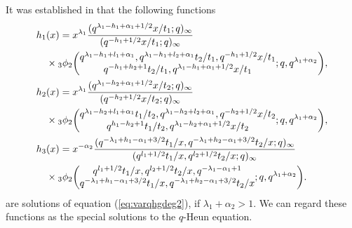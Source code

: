 \documentclass[12pt]{amsart}
\numberwithin{equation}{section}
\theoremstyle{definition}
\theoremstyle{remark}
\begin{document}
It was established in \cite[Theorem 4.5]{AT} that the following functions
 \begin{align}
& h_1 (x) = x^{ \lambda _{1} } \frac{( q^{ \lambda _{1} - h_{1} + \alpha _{1} + 1/2}x/t_{1}; q)_\infty}{( q^{-h_{1} + 1/2}x/t_{1}; q)_\infty} \label{eq:solvarHG2} \\
  &\quad \times {}_3\phi_2 \biggl( \begin{array}{@{}c@{}} q^{ \lambda _{1} -h_{1} + l_{1} + \alpha _{1} }, q^{ \lambda _{1} -h_{1} + l_{2} + \alpha _{1} }t_{2}/t_{1}, q^{-h_{1} + 1/2}x/t_{1} \\
     q^{- h_{1} + h_{2} + 1}t_{2}/t_{1}, q^{ \lambda _{1} - h_{1} + \alpha _{1} + 1/2}x/t_{1} \end{array} ;q,q^{ \lambda _{1}  + \alpha_{2} } \biggr), \notag \\
  & h_2 (x) = x^{ \lambda _{1} } \frac{( q^{ \lambda _{1} - h_{2} + \alpha _{1} + 1/2}x/t_{2}; q)_\infty}{( q^{-h_{2} + 1/2}x/t_{2}; q)_\infty} \notag \\
  &\quad \times {}_3\phi_2 \biggl( \begin{array}{@{}c@{}} q^{ \lambda _{1} -h_{2} + l_{1} + \alpha _{1} }t_{1}/t_{2}, q^{ \lambda _{1} -h_{2} + l_{2} + \alpha _{1} }, q^{-h_{2} + 1/2}x/t_{2} \\
     q^{h_{1} - h_{2} + 1}t_{1}/t_{2}, q^{ \lambda _{1} - h_{2} + \alpha _{1} + 1/2}x/t_{2} \end{array} ;q,q^{ \lambda _{1}  + \alpha_{2} } \biggr), \notag \\
 & h_3 (x) =x^{ - \alpha_{2} } \frac{(q^{- \lambda _{1} + h_{1} - \alpha _{1} + 3/2}t_{1}/x, q^{- \lambda _{1} + h_{2} - \alpha _{1} + 3/2}t_{2}/x ; q)_{\infty}}{(q^{l_{1} + 1/2}t_{1}/x, q^{l_{2} + 1/2}t_{2}/x ; q)_{\infty}} \notag \\
  &\quad \times {}_3\phi_2 \biggl( \begin{array}{@{}c@{}} q^{l_{1} + 1/2}t_{1}/x, q^{l_{2} + 1/2}t_{2}/x, q^{- \lambda _{1} - \alpha _{1} + 1} \\
     q^{- \lambda _{1} + h_{1} - \alpha _{1} + 3/2}t_{1}/x, q^{- \lambda _{1} + h_{2} - \alpha _{1} + 3/2}t_{2}/x \end{array} ;q,q^{ \lambda _{1}  + \alpha_{2} } \biggr). \notag 
  \end{align}
are solutions of equation (\ref{eq:varqhgdeg2}), if $\lambda _1 +\alpha _2 >1 $.
We can regard these functions as the special solutions to the $q$-Heun equation.
\end{document}
